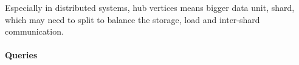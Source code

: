 
Especially in distributed systems, hub vertices means bigger data unit, \eg
shard, which may need to split to balance the storage, load and inter-shard
communication.


\paragraph{Queries}
{\raggedright
}